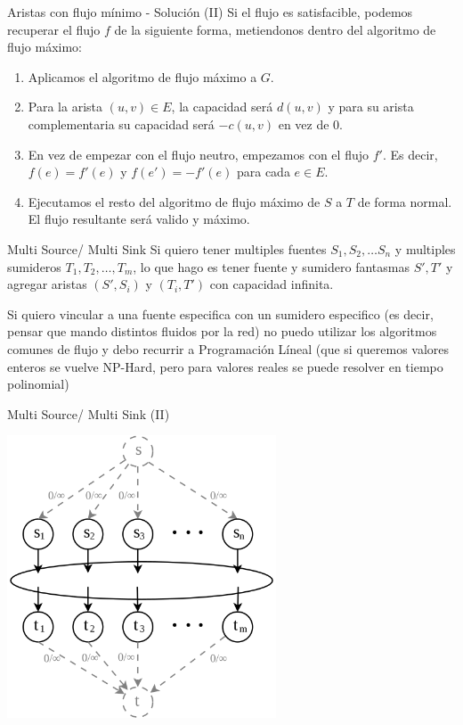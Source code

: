 \documentclass{beamer}
\begin{document}
\begin{frame}{Aristas con flujo mínimo - Solución (II)}
    Si el flujo es satisfacible, podemos recuperar el flujo $f$ de la siguiente forma, metiendonos dentro del algoritmo de flujo máximo:
    \begin{enumerate}
        \item Aplicamos el algoritmo de flujo máximo a $G$.
        \pause 
        \item Para la arista $(u,v) \in E$, la capacidad será $d(u,v)$ y para su arista complementaria su capacidad será $-c(u,v)$ en vez de 0.
        \pause
        \item En vez de empezar con el flujo neutro, empezamos con el flujo $f'$. Es decir, $f(e) = f'(e)$ y $f(e') = -f'(e)$ para cada $e \in E$.
        \pause
        \item Ejecutamos el resto del algoritmo de flujo máximo de $S$ a $T$ de forma normal. El flujo resultante será valido y máximo.
    \end{enumerate}
\end{frame}



\begin{frame}{Multi Source/ Multi Sink}
    Si quiero tener multiples fuentes $S_1, S_2, \dots S_n$ y multiples sumideros $T_1, T_2, \dots, T_m$, lo que hago es tener fuente y sumidero fantasmas $S', T'$ y agregar aristas $(S',S_i)$ y $(T_i,T')$ con capacidad infinita.

    \pause
    \vspace{2em}

    Si quiero vincular a una fuente especifica con un sumidero especifico (es decir, pensar que mando distintos fluidos por la red) no puedo utilizar los algoritmos comunes de flujo y debo recurrir a Programación Líneal (que si queremos valores enteros se vuelve NP-Hard, pero para valores reales se puede resolver en tiempo polinomial)
\end{frame}

\begin{frame}{Multi Source/ Multi Sink (II)}
    \begin{center}
        \includegraphics[width=0.6\textwidth]{imgs/multi-st.png}
    \end{center}
\end{frame}
\end{document}
